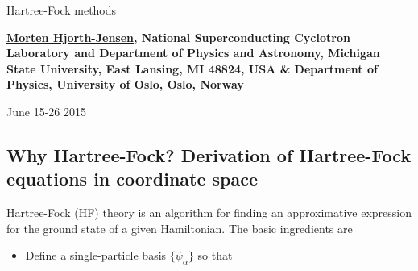 \documentclass[%
twoside,                 %
final,                   %
10pt]{article}
\begin{document}






\thispagestyle{empty}

\begin{center}
{\LARGE\bf
\begin{spacing}{1.25}
Hartree-Fock methods
\end{spacing}
}
\end{center}


\begin{center}
{\bf \href{{http://computationalphysics.no}}{Morten Hjorth-Jensen}, National Superconducting Cyclotron Laboratory and Department of Physics and Astronomy, Michigan State University, East Lansing, MI 48824, USA {\&} Department of Physics, University of Oslo, Oslo, Norway${}^{}$} \\ [0mm]
\end{center}

    \begin{center}
\end{center}
    

\begin{center} %
June 15-26 2015
\end{center}

\vspace{1cm}


\tableofcontents


\vspace{1cm} %




\subsection*{Why Hartree-Fock? Derivation of Hartree-Fock equations in coordinate space}

Hartree-Fock (HF) theory is an algorithm for finding an approximative expression for the ground state of a given Hamiltonian. The basic ingredients are
\begin{itemize}
  \item Define a single-particle basis $\{\psi_{\alpha}\}$ so that
\end{itemize}
\end{document}
